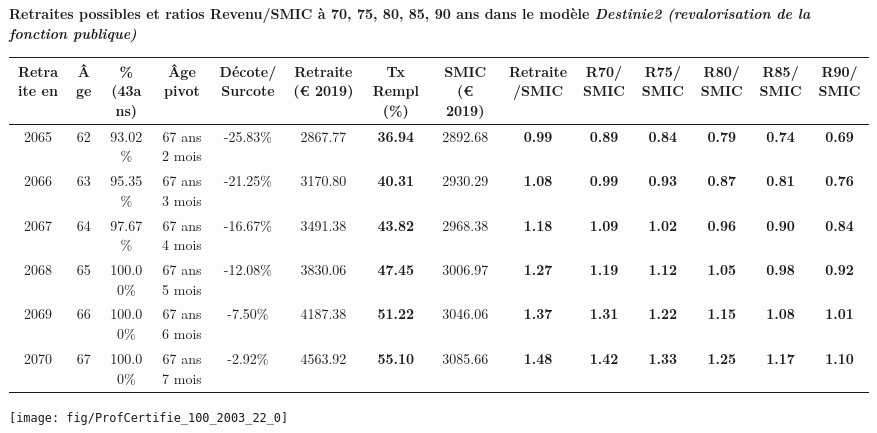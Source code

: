  \vspace{0.1cm} 
{\bf \noindent Retraites possibles et ratios Revenu/SMIC à 70, 75, 80, 85, 90 ans dans le modèle \emph{Destinie2 (revalorisation de la fonction publique)}}  
 
\begin{adjustbox}{max width=\textwidth} 
\begin{tabular}[htb]{|c|c||c|c|c||c|c||c|c||c|c|c|c|c|} 
\hline 
 Retraite en &  Âge &  \%(43ans) &  Âge pivot &  Décote/Surcote &  Retraite (\euro{} 2019) &  Tx Rempl(\%) &  SMIC (\euro{} 2019) &  Retraite/SMIC &  R70/SMIC &  R75/SMIC &  R80/SMIC &  R85/SMIC &  R90/SMIC \\ 
\hline \hline 
 2065 &  62 &  93.02\% &  67 ans 2 mois &  -25.83\% &  2867.77 &  {\bf 36.94} &  2892.68 &  {\bf {\color{red} 0.99}} &  {\bf {\color{red} 0.89}} &  {\bf {\color{red} 0.84}} &  {\bf {\color{red} 0.79}} &  {\bf {\color{red} 0.74}} &  {\bf {\color{red} 0.69}} \\ 
\hline 
 2066 &  63 &  95.35\% &  67 ans 3 mois &  -21.25\% &  3170.80 &  {\bf 40.31} &  2930.29 &  {\bf 1.08} &  {\bf {\color{red} 0.99}} &  {\bf {\color{red} 0.93}} &  {\bf {\color{red} 0.87}} &  {\bf {\color{red} 0.81}} &  {\bf {\color{red} 0.76}} \\ 
\hline 
 2067 &  64 &  97.67\% &  67 ans 4 mois &  -16.67\% &  3491.38 &  {\bf 43.82} &  2968.38 &  {\bf 1.18} &  {\bf 1.09} &  {\bf 1.02} &  {\bf {\color{red} 0.96}} &  {\bf {\color{red} 0.90}} &  {\bf {\color{red} 0.84}} \\ 
\hline 
 2068 &  65 &  100.00\% &  67 ans 5 mois &  -12.08\% &  3830.06 &  {\bf 47.45} &  3006.97 &  {\bf 1.27} &  {\bf 1.19} &  {\bf 1.12} &  {\bf 1.05} &  {\bf {\color{red} 0.98}} &  {\bf {\color{red} 0.92}} \\ 
\hline 
 2069 &  66 &  100.00\% &  67 ans 6 mois &  -7.50\% &  4187.38 &  {\bf 51.22} &  3046.06 &  {\bf 1.37} &  {\bf 1.31} &  {\bf 1.22} &  {\bf 1.15} &  {\bf 1.08} &  {\bf 1.01} \\ 
\hline 
 2070 &  67 &  100.00\% &  67 ans 7 mois &  -2.92\% &  4563.92 &  {\bf 55.10} &  3085.66 &  {\bf 1.48} &  {\bf 1.42} &  {\bf 1.33} &  {\bf 1.25} &  {\bf 1.17} &  {\bf 1.10} \\ 
\hline 
\hline 
\end{tabular} 
\end{adjustbox} 
 
 \vspace{0.1cm} 

 {\hspace{-2.2cm}\texttt{[image: fig/ProfCertifie\_100\_2003\_22\_0]}} 

